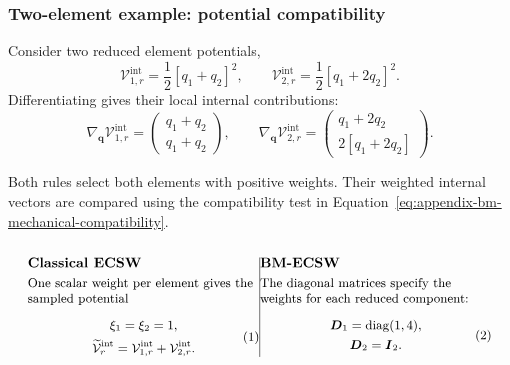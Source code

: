 \documentclass[a4paper,12pt]{article}
\newcommand{\vect}[1]{\boldsymbol{#1}}
\newcommand{\matr}[1]{\boldsymbol{#1}}
\begin{document}
\subsubsection{Two-element example: potential compatibility}
\label{sec:appendix-structural-potential-example}
Consider two reduced element potentials,
\begin{equation}
 \mathcal V_{1,r}^{\mathrm{int}}=\frac12[q_1+q_2]^2,
 \qquad
 \mathcal V_{2,r}^{\mathrm{int}}=\frac12[q_1+2q_2]^2.
 \label{eq:appendix-two-element-potentials}
\end{equation}
Differentiating gives their local internal contributions:
\begin{equation}
 \nabla_{\vect{q}}\mathcal V_{1,r}^{\mathrm{int}}
 =\begin{pmatrix}q_1+q_2\\q_1+q_2\end{pmatrix},
 \qquad
 \nabla_{\vect{q}}\mathcal V_{2,r}^{\mathrm{int}}
 =\begin{pmatrix}q_1+2q_2\\2[q_1+2q_2]\end{pmatrix}.
 \label{eq:appendix-structural-element-gradients}
\end{equation}

Both rules select both elements with positive weights. Their weighted internal vectors are compared using the compatibility test in Equation~\eqref{eq:appendix-bm-mechanical-compatibility}.

\begin{subequations}
 \label{eq:appendix-structural-example-weights}
 \noindent
 \begin{minipage}[t]{0.48\linewidth}
  \vspace{0pt}\raggedright
  \textbf{Classical ECSW}\par\smallskip
  \small
  One scalar weight per element gives the sampled potential
  \begin{equation}
   \begin{gathered}
    \xi_1=\xi_2=1,\\
    \widetilde{\mathcal V}_r^{\mathrm{int}}
    =\mathcal V_{1,r}^{\mathrm{int}}+\mathcal V_{2,r}^{\mathrm{int}}.
   \end{gathered}
   \label{eq:appendix-structural-classical-potential}
  \end{equation}
 \end{minipage}\hfill\vrule width 0.4pt\hfill%
 \begin{minipage}[t]{0.48\linewidth}
  \vspace{0pt}\raggedright
  \textbf{BM-ECSW}\par\smallskip
  \small
  The diagonal matrices specify the weights for each reduced component:
  \begin{equation}
   \begin{gathered}
    \matr{D}_1=\operatorname{diag}(1,4),\\
    \matr{D}_2=\matr{I}_2.
   \end{gathered}
   \label{eq:appendix-structural-bm-weights}
  \end{equation}
 \end{minipage}
\end{subequations}
\end{document}
